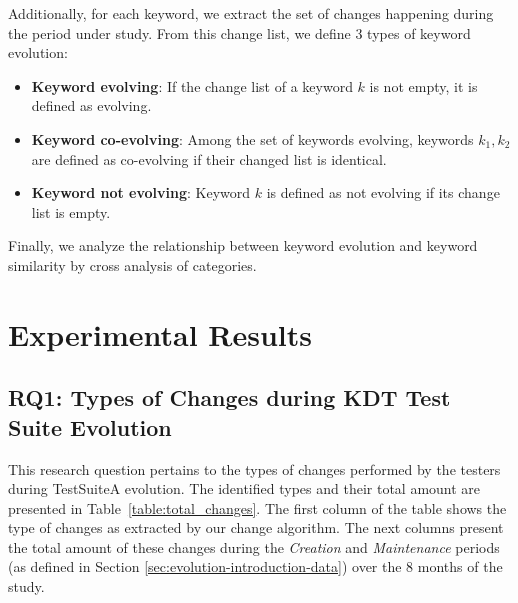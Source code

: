  Additionally, for each keyword, we extract the set of changes happening during the period under study. From this change list, we define 3 types of keyword evolution:
 
 \begin{itemize}
   \item \textbf{Keyword evolving}: If the change list of a keyword $k$ is not empty, it is defined as evolving.
   
   \item \textbf{Keyword co-evolving}: Among the set of keywords evolving, keywords $k_1, k_2$ are defined as co-evolving if their changed list is identical.
   
   \item \textbf{Keyword not evolving}: Keyword $k$ is defined as not evolving if its change list is empty. 
 \end{itemize}

 Finally, we analyze the relationship between keyword evolution and keyword similarity by cross analysis of categories.

\section{Experimental Results}
\label{sec:evolution-results}

\subsection{RQ1: Types of Changes during KDT  Test Suite Evolution}
\label{sec:evolution-results-rq1}

This research question pertains to the types of changes performed by the testers during TestSuiteA evolution. The identified types and their total amount are presented in Table~\ref{table:total_changes}. The first column of the table shows the type of changes as extracted by our change algorithm. The next columns present the total amount of these changes during the \emph{Creation} and \emph{Maintenance} periods (as defined in Section \ref{sec:evolution-introduction-data}) over the 8 months of the study.

